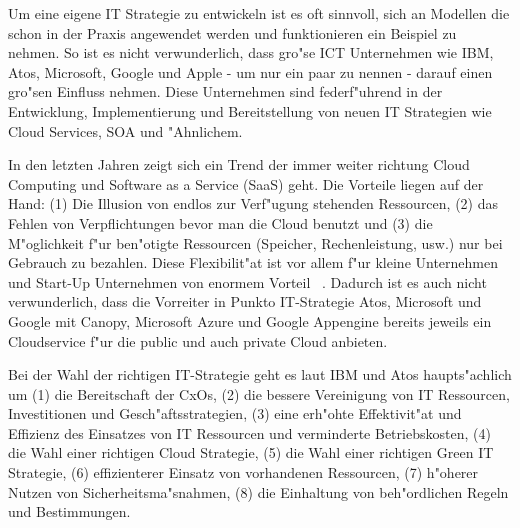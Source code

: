 Um eine eigene IT Strategie zu entwickeln ist es oft sinnvoll, sich an Modellen die schon in der Praxis angewendet werden und funktionieren ein Beispiel zu nehmen. So ist es nicht verwunderlich, dass gro"se ICT Unternehmen wie IBM, Atos, Microsoft, Google und Apple - um nur ein paar zu nennen - darauf einen gro"sen Einfluss nehmen. Diese Unternehmen sind federf"uhrend in der Entwicklung, Implementierung und Bereitstellung von neuen IT Strategien wie Cloud Services, SOA und "Ahnlichem.

In den letzten Jahren zeigt sich ein Trend der immer weiter richtung Cloud Computing und Software as a Service (SaaS) geht. Die Vorteile liegen auf der Hand: (1) Die Illusion von endlos zur Verf"ugung stehenden Ressourcen, (2) das Fehlen von Verpflichtungen bevor man die Cloud benutzt und (3) die M"oglichkeit f"ur ben"otigte Ressourcen (Speicher, Rechenleistung, usw.) nur bei Gebrauch zu bezahlen. Diese Flexibilit"at ist vor allem f"ur kleine Unternehmen und Start-Up Unternehmen von enormem Vorteil ~\cite{Armbrust2009}. Dadurch ist es auch nicht verwunderlich, dass die Vorreiter in Punkto IT-Strategie Atos, Microsoft und Google mit Canopy, Microsoft Azure und Google Appengine bereits jeweils ein Cloudservice f"ur die public und auch private Cloud anbieten.

Bei der Wahl der richtigen IT-Strategie geht es laut IBM und Atos haupts"achlich um (1) die Bereitschaft der CxOs, (2) die bessere Vereinigung von IT Ressourcen, Investitionen und Gesch"aftsstrategien, (3) eine erh"ohte Effektivit"at und Effizienz des Einsatzes von IT Ressourcen und verminderte Betriebskosten, (4) die Wahl einer richtigen Cloud Strategie, (5) die Wahl einer richtigen Green IT Strategie, (6) effizienterer Einsatz von vorhandenen Ressourcen, (7) h"oherer Nutzen von Sicherheitsma"snahmen, (8) die Einhaltung von beh"ordlichen Regeln und Bestimmungen.

